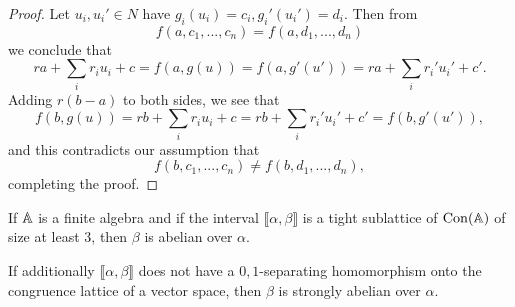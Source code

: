 \begin{appendices}
\begin{proof}
Let $u_i, u_i' \in N$ have $g_i(u_i) = c_i, g_i'(u_i') = d_i$. Then from
\[
f(a, c_1, ..., c_n) = f(a, d_1, ..., d_n)
\]
we conclude that
\[
ra + \sum_i r_iu_i + c = f(a, g(u)) = f(a, g'(u')) = ra + \sum_i r_i'u_i' + c'.
\]
Adding $r(b-a)$ to both sides, we see that
\[
f(b, g(u)) = rb + \sum_i r_iu_i + c = rb + \sum_i r_i'u_i' + c' = f(b, g'(u')),
\]
and this contradicts our assumption that
\[
f(b, c_1, ..., c_n) \ne f(b, d_1, ..., d_n),
\]
completing the proof.
\end{proof}

\begin{cor} If $\mathbb{A}$ is a finite algebra and if the interval $\llbracket \alpha, \beta \rrbracket$ is a tight sublattice of $\operatorname{Con}(\mathbb{A})$ of size at least $3$, then $\beta$ is abelian over $\alpha$.

If additionally $\llbracket \alpha, \beta \rrbracket$ does not have a $0,1$-separating homomorphism onto the congruence lattice of a vector space, then $\beta$ is strongly abelian over $\alpha$.
\end{cor}




\end{appendices}

